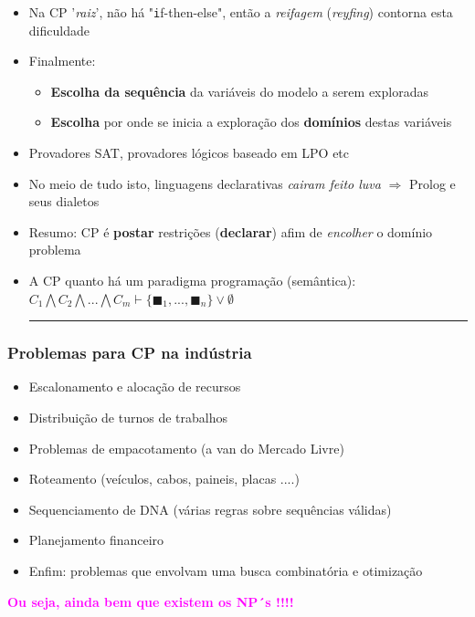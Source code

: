 \documentclass{beamer}
\begin{document}
\begin{frame}[fragile, allowframebreaks=0.9]
  \begin{itemize}    
    
    \item Na CP '{\em raiz}', não há  "{\texttt if-then-else}", então a {\em reifagem} ({\em reyfing}) contorna esta dificuldade
        
    \item Finalmente:
    \begin{itemize}
        \item {\bf Escolha da sequência} da variáveis do modelo a serem exploradas
        \item {\bf Escolha} por onde se inicia a exploração dos {\bf domínios} destas variáveis
    \end{itemize}
    
  
    \item Provadores SAT, provadores lógicos baseado em LPO etc
    
    \item No meio de tudo isto, linguagens declarativas {\em cairam feito luva} $\Rightarrow$ Prolog e seus dialetos
    
    \item Resumo: CP é {\bf postar} restrições ({\bf declarar}) afim de {\em encolher} o domínio problema
    
    \item A CP quanto  há um paradigma programação (semântica):\\ $C_1 \bigwedge C_2 \bigwedge ...\bigwedge C_m \vdash \{\blacksquare_1 , ..., \blacksquare_n \} \vee \emptyset $ \\
    \noindent \textcolor{magenta}{ \rule{6cm}{10pt} }

  \end{itemize}

\end{frame}


\begin{frame}[fragile]

\frametitle{Problemas para CP na indústria}

\begin{itemize}
    \item Escalonamento e alocação de recursos
    \item Distribuição de turnos de trabalhos 
    \item Problemas de empacotamento (a van do Mercado Livre)
    \item Roteamento (veículos, cabos, paineis, placas ....)
    \item Sequenciamento de DNA (várias regras sobre sequências válidas)
    \item Planejamento financeiro
    \item Enfim: problemas que envolvam uma busca combinatória e otimização 
\end{itemize}

{\bf \textcolor{magenta}{Ou seja, ainda bem que existem os NP´s !!!!}}
 
\end{frame}
\end{document}
